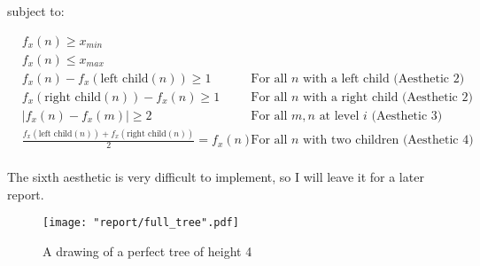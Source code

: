 \documentclass[11pt]{report}
\newcommand{\abs}[1]{\left|#1\right|}
\newcommand{\leftc}[1]{\text{left child}\left(#1\right)}
\newcommand{\rightc}[1]{\text{right child}\left(#1\right)}
\begin{document}
subject to:

\[
\begin{aligned}
    &f_x(n) \geq x_{min} \\
    &f_x(n) \leq x_{max} \\
    &f_x(n) - f_x( \leftc{n} ) \geq 1 &\text{For all $n$ with a left child (Aesthetic 2)} \\
    &f_x( \rightc{n} ) - f_x(n) \geq 1 &\text{For all $n$ with a right child (Aesthetic 2)} \\
    &\abs{f_x(n) - f_x(m)} \geq 2 &\text{For all $m, n$ at level $i$ (Aesthetic 3)} \\
    &\frac{ f_x(\leftc{n}) + f_x(\rightc{n}) }{2} = f_x(n)
         &\text{For all $n$ with two children (Aesthetic 4)} \\
\end{aligned}
\]

The sixth aesthetic is very difficult to implement, so I will leave it for a later report. \\

\begin{figure}[H]
    \centering
    \texttt{[image: "report/full\_tree".pdf]}
    \caption{A drawing of a perfect tree of height 4}
\end{figure}
\end{document}
